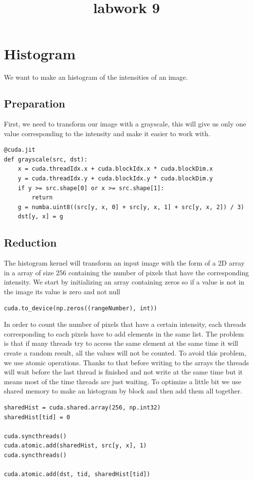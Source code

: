 \documentclass{report}
\begin{document}
\title{labwork 9}
\maketitle
\section{Histogram}
We want to make an histogram of the intensities of an image.
\subsection{Preparation}
First, we need to transform our image with a grayscale, this will give us only one value corresponding to the intensity and make it easier to work with.
\begin{lstlisting}
@cuda.jit
def grayscale(src, dst):
    x = cuda.threadIdx.x + cuda.blockIdx.x * cuda.blockDim.x
    y = cuda.threadIdx.y + cuda.blockIdx.y * cuda.blockDim.y
    if y >= src.shape[0] or x >= src.shape[1]:
        return
    g = numba.uint8((src[y, x, 0] + src[y, x, 1] + src[y, x, 2]) / 3)
    dst[y, x] = g
\end{lstlisting}
\subsection{Reduction}
The histogram kernel will transform an input image with the form of a 2D array in a array of size 256 containing the number of pixels that have the corresponding intensity.
\newline
We start by initializing an array containing zeros so if a value is not in the image its value is zero and not null
\begin{lstlisting}
cuda.to_device(np.zeros((rangeNumber), int))
\end{lstlisting}
In order to count the number of pixels that have a certain intensity, each threads corresponding to each pixels have to add elements in the same list. The problem is that if many threads try to access the same element at the same time it will create a random result, all the values will not be counted. To avoid this problem, we use atomic operations. Thanks to that before writing to the arrays the threads will wait before the last thread is finished and not write at the same time but it means most of the time threads are just waiting. To optimize a little bit we use shared memory to make an histogram by block and then add them all together.
\begin{lstlisting}
sharedHist = cuda.shared.array(256, np.int32)
sharedHist[tid] = 0

cuda.syncthreads()
cuda.atomic.add(sharedHist, src[y, x], 1)
cuda.syncthreads()

cuda.atomic.add(dst, tid, sharedHist[tid])
\end{lstlisting}
\end{document}
